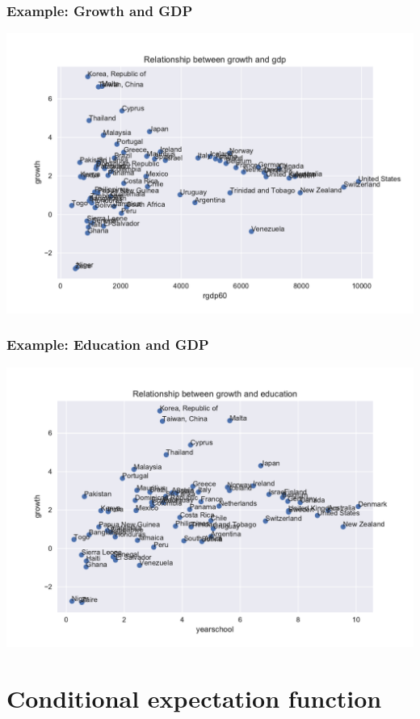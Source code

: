 \begin{frame}\frametitle{Example: Growth and GDP}
\includegraphics[width=\figwidth,height=\figheight]{GrowthGDP_fig.pdf}
 \end{frame}

\begin{frame}\frametitle{Example: Education and GDP}
\includegraphics[width=\figwidth,height=\figheight]{GrowthSchool_fig.pdf}
\end{frame}


\section{Conditional expectation function}

